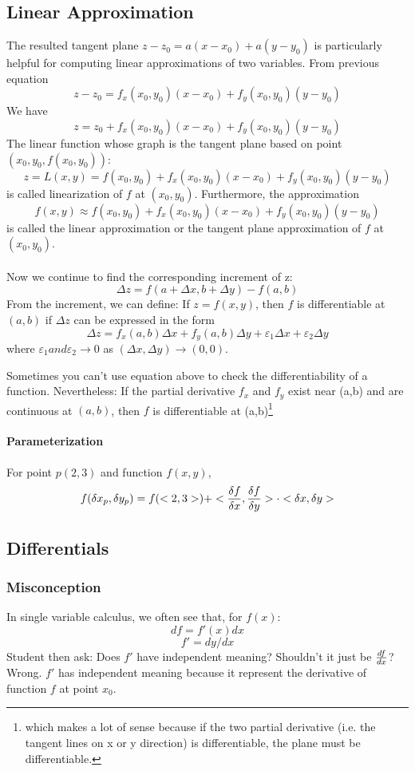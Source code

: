 \documentclass[11pt, oneside]{article}   	%
\begin{document}
\subsection{Linear Approximation}
The resulted tangent plane $z - z_0 = a(x-x_0)+a(y-y_0)$ is particularly helpful for computing linear approximations of two variables. From previous equation $$z - z_0 = f_x(x_0, y_0)(x-x_0)+f_y(x_0,y_0)(y-y_0)$$ We have  $$z = z_0 + f_x(x_0, y_0)(x-x_0)+f_y(x_0,y_0)(y-y_0)$$  The linear function whose graph is the tangent plane based on point $(x_0, y_0, f(x_0, y_0))$: $$z = L(x, y) = f(x_0,y_0)+f_x(x_0, y_0)(x-x_0)+f_y(x_0,y_0)(y-y_0)$$ is called linearization of $f$ at $(x_0, y_0)$. Furthermore, the approximation $$ f(x, y) \approx f(x_0,y_0)+f_x(x_0, y_0)(x-x_0)+f_y(x_0,y_0)(y-y_0)$$ is called the linear approximation or the tangent plane approximation of $f$ at $(x_0, y_0)$.
\paragraph{}
Now we continue to find the corresponding increment of z: $$\Delta z = f(a+\Delta x, b+\Delta y) - f(a,b)$$ From the increment, we can define: 
If $z = f(x, y)$, then $f$ is differentiable at $(a,b)$ if $\Delta z$ can be expressed in the form $$\Delta z = f_x(a, b)\Delta x +  f_y(a, b)\Delta y  + \varepsilon_1\Delta x+  \varepsilon_2\Delta y$$where $\varepsilon _1 and \varepsilon _2 \to 0$ as $(\Delta x, \Delta y) \to (0,0)$.

Sometimes you can't use equation above to check the differentiability of a function. Nevertheless: If the partial derivative $f_x$ and $f_y$ exist near (a,b) and are continuous at $(a,b)$, then $f$ is differentiable at (a,b)\footnote{which makes a lot of sense because if the two partial derivative (i.e. the tangent lines on x or y direction) is differentiable, the plane must be differentiable.}

\paragraph{Parameterization}
For point $p(2, 3)$ and function $f(x,y)$, 
$$f(\delta x_p, \delta y_p) = f(<2,  3>) + <{\delta f \over {\delta x}}, {\delta f \over {\delta y}}> \cdot <\delta x, \delta y>$$

\subsection{Differentials}
\subsubsection{Misconception}
In single variable calculus, we often see that, for $f(x)$: $$df = f'(x)dx$$ $$f' = dy /dx$$ Student then ask: Does $f'$ have independent meaning? Shouldn't it just be $df\over dx$? Wrong. $f'$ has independent meaning because it represent the derivative of function $f$ at point $x_0$. 
\end{document}

